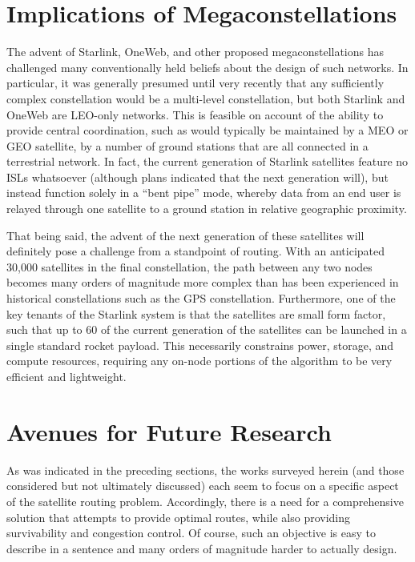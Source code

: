 
\section{Implications of Megaconstellations}\label{subsec:megaconstellations}
The advent of Starlink, OneWeb, and other proposed megaconstellations has challenged many conventionally held beliefs about the design of such networks. In particular, it was generally presumed until very recently that any sufficiently complex constellation would be a multi-level constellation, but both Starlink and OneWeb are LEO-only networks. This is feasible on account of the ability to provide central coordination, such as would typically be maintained by a MEO or GEO satellite, by a number of ground stations that are all connected in a terrestrial network. In fact, the current generation of Starlink satellites feature no ISLs whatsoever (although plans indicated that the next generation will), but instead function solely in a ``bent pipe'' mode, whereby data from an end user is relayed through one satellite to a ground station in relative geographic proximity\cite{chaudhry_laser_2021}.

That being said, the advent of the next generation of these satellites will definitely pose a challenge from a standpoint of routing. With an anticipated 30,000 satellites in the final constellation, the path between any two nodes becomes many orders of magnitude more complex than has been experienced in historical constellations such as the GPS constellation. Furthermore, one of the key tenants of the Starlink system is that the satellites are small form factor, such that up to 60 of the current generation of the satellites can be launched in a single standard rocket payload. This necessarily constrains power, storage, and compute resources, requiring any on-node portions of the algorithm to be very efficient and lightweight.

\section{Avenues for Future Research}\label{futureResearch}
As was indicated in the preceding sections, the works surveyed herein (and those considered but not ultimately discussed) each seem to focus on a specific aspect of the satellite routing problem. Accordingly, there is a need for a comprehensive solution that attempts to provide optimal routes, while also providing survivability and congestion control. Of course, such an objective is easy to describe in a sentence and many orders of magnitude harder to actually design.

